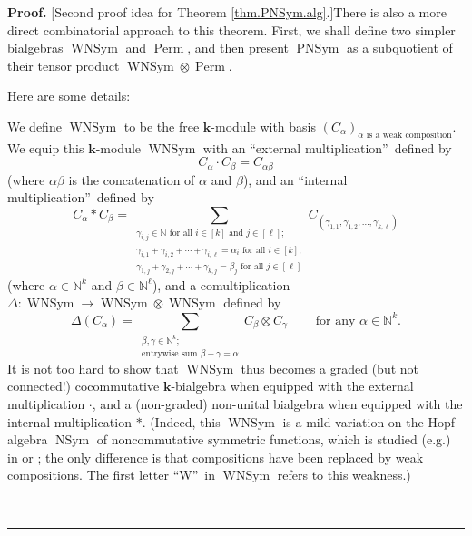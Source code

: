 \documentclass[numbers=enddot,12pt,final,onecolumn,notitlepage]{scrartcl}%
\theoremstyle{definition}
\newenvironment{proof}[1][Proof]{\noindent\textbf{#1.} }{\ \rule{0.5em}{0.5em}}
\let\sumnonlimits\sum
\renewcommand{\sum}{\sumnonlimits\limits}
\begin{document}
\begin{proof}
[Second proof idea for Theorem \ref{thm.PNSym.alg}.]There is also a more
direct combinatorial approach to this theorem. First, we shall define two
simpler bialgebras $\operatorname*{WNSym}$ and $\operatorname*{Perm}$, and
then present $\operatorname*{PNSym}$ as a subquotient of their tensor product
$\operatorname*{WNSym}\otimes\operatorname*{Perm}$.

Here are some details:

We define $\operatorname*{WNSym}$ to be the free $\mathbf{k}$-module with
basis $\left(  C_{\alpha}\right)  _{\alpha\text{ is a weak composition}}$. We
equip this $\mathbf{k}$-module $\operatorname*{WNSym}$ with an
\textquotedblleft external multiplication\textquotedblright\ defined by%
\[
C_{\alpha}\cdot C_{\beta}=C_{\alpha\beta}%
\]
(where $\alpha\beta$ is the concatenation of $\alpha$ and $\beta$), and an
\textquotedblleft internal multiplication\textquotedblright\ defined by%
\[
C_{\alpha}\ast C_{\beta}=\sum_{\substack{\gamma_{i,j}\in\mathbb{N}\text{ for
all }i\in\left[  k\right]  \text{ and }j\in\left[  \ell\right]  ;\\\gamma
_{i,1}+\gamma_{i,2}+\cdots+\gamma_{i,\ell}=\alpha_{i}\text{ for all }%
i\in\left[  k\right]  ;\\\gamma_{1,j}+\gamma_{2,j}+\cdots+\gamma_{k,j}%
=\beta_{j}\text{ for all }j\in\left[  \ell\right]  }}C_{\left(  \gamma
_{1,1},\gamma_{1,2},\ldots,\gamma_{k,\ell}\right)  }%
\]
(where $\alpha\in\mathbb{N}^{k}$ and $\beta\in\mathbb{N}^{\ell}$), and a
comultiplication $\Delta:\operatorname*{WNSym}\rightarrow\operatorname*{WNSym}%
\otimes\operatorname*{WNSym}$ defined by%
\[
\Delta\left(  C_{\alpha}\right)  =\sum_{\substack{\beta,\gamma\in
\mathbb{N}^{k}\text{;}\\\text{entrywise sum }\beta+\gamma=\alpha}}C_{\beta
}\otimes C_{\gamma}\ \ \ \ \ \ \ \ \ \ \text{for any }\alpha\in\mathbb{N}%
^{k}.
\]
It is not too hard to show that $\operatorname*{WNSym}$ thus becomes a graded
(but not connected!) cocommutative $\mathbf{k}$-bialgebra when equipped with
the external multiplication $\cdot$, and a (non-graded) non-unital bialgebra
when equipped with the internal multiplication $\ast$. (Indeed, this
$\operatorname*{WNSym}$ is a mild variation on the Hopf algebra
$\operatorname*{NSym}$ of noncommutative symmetric functions, which is studied
(e.g.) in \cite{ncsf1} or \cite[\S 5.4]{GriRei}; the only difference is that
compositions have been replaced by weak compositions. The first letter
\textquotedblleft W\textquotedblright\ in $\operatorname*{WNSym}$ refers to
this weakness.)


\end{proof}
\end{document}

